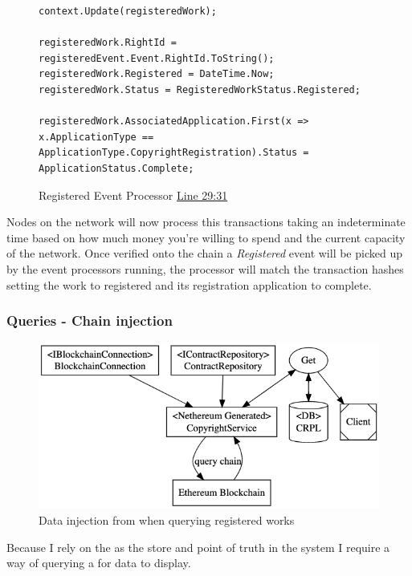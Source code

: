 \begin{figure}[H]
\caption{Registered Event Processor \href{https://github.com/MrHarrisonBarker/CRPL/blob/main/CRPL.Web/Core/EventProcessors/RegisteredEventProcessor.cs}{Line 29:31}}
\centering
\begin{lstlisting}[language=CSharp]
context.Update(registeredWork);

registeredWork.RightId = registeredEvent.Event.RightId.ToString();
registeredWork.Registered = DateTime.Now;
registeredWork.Status = RegisteredWorkStatus.Registered;

registeredWork.AssociatedApplication.First(x => x.ApplicationType == ApplicationType.CopyrightRegistration).Status = ApplicationStatus.Complete;	
\end{lstlisting}
\end{figure}

Nodes on the network will now process this transactions taking an indeterminate time based on how much money you're willing to spend and the current capacity of the network. Once verified onto the chain a \textit{Registered} event will be picked up by the event processors running, the processor will match the transaction hashes setting the work to registered and its registration application to complete.

\subsubsection{Queries - Chain injection}

\begin{figure}[H]
\caption{Data injection from  when querying registered works}
\centering
\includegraphics[width=\textwidth,height=\textheight,keepaspectratio]{images/operational/chain-inject}
\end{figure}

Because I rely on the  as the store and point of truth in the system I require a way of querying a  for data to display. 

